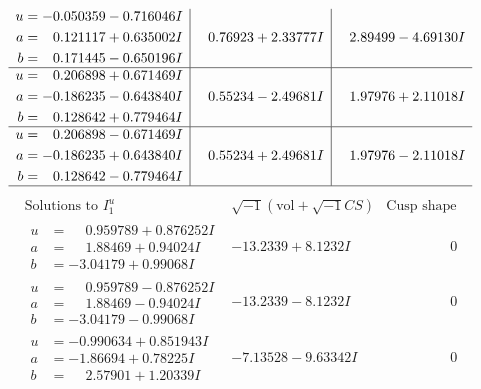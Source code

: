 \documentclass[1p]{elsarticle_modified}
\theoremstyle{definition}
\newcommand{\I}{\sqrt{-1}}
\begin{document}
$$\begin{array}{c|c|c}
\begin{aligned}
u &= -0.050359 - 0.716046 I \\
a &= \phantom{-}0.121117 + 0.635002 I \\
b &= \phantom{-}0.171445 - 0.650196 I\end{aligned}
 & \phantom{-}0.76923 + 2.33777 I & \phantom{-}2.89499 - 4.69130 I \\ \hline\begin{aligned}
u &= \phantom{-}0.206898 + 0.671469 I \\
a &= -0.186235 - 0.643840 I \\
b &= \phantom{-}0.128642 + 0.779464 I\end{aligned}
 & \phantom{-}0.55234 - 2.49681 I & \phantom{-}1.97976 + 2.11018 I \\ \hline\begin{aligned}
u &= \phantom{-}0.206898 - 0.671469 I \\
a &= -0.186235 + 0.643840 I \\
b &= \phantom{-}0.128642 - 0.779464 I\end{aligned}
 & \phantom{-}0.55234 + 2.49681 I & \phantom{-}1.97976 - 2.11018 I\\
 \hline 
 \end{array}$$\newpage$$\begin{array}{c|c|c}  
\text{Solutions to }I^u_{1}& \I (\text{vol} + \sqrt{-1}CS) & \text{Cusp shape}\\
 \hline 
\begin{aligned}
u &= \phantom{-}0.959789 + 0.876252 I \\
a &= \phantom{-}1.88469 + 0.94024 I \\
b &= -3.04179 + 0.99068 I\end{aligned}
 & -13.2339 + 8.1232 I & \phantom{-0.000000 } 0 \\ \hline\begin{aligned}
u &= \phantom{-}0.959789 - 0.876252 I \\
a &= \phantom{-}1.88469 - 0.94024 I \\
b &= -3.04179 - 0.99068 I\end{aligned}
 & -13.2339 - 8.1232 I & \phantom{-0.000000 } 0 \\ \hline\begin{aligned}
u &= -0.990634 + 0.851943 I \\
a &= -1.86694 + 0.78225 I \\
b &= \phantom{-}2.57901 + 1.20339 I\end{aligned}
 & -7.13528 - 9.63342 I & \phantom{-0.000000 } 0 \\ \hline\begin{aligned}

\end{aligned}
\end{array}$$
\end{document}
